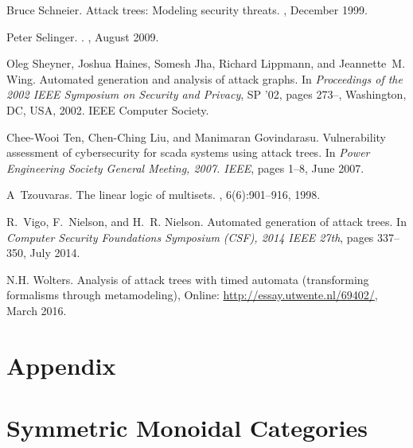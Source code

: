 \documentclass{sigplanconf}
\begin{document}
\begin{thebibliography}{10}
Bruce Schneier.
\newblock Attack trees: Modeling security threats.
, December 1999.

Peter {Selinger}.
.
, August 2009.

Oleg Sheyner, Joshua Haines, Somesh Jha, Richard Lippmann, and Jeannette~M.
  Wing.
\newblock Automated generation and analysis of attack graphs.
\newblock In {\em Proceedings of the 2002 IEEE Symposium on Security and
  Privacy}, SP '02, pages 273--, Washington, DC, USA, 2002. IEEE Computer
  Society.

Chee-Wooi Ten, Chen-Ching Liu, and Manimaran Govindarasu.
\newblock Vulnerability assessment of cybersecurity for scada systems using
  attack trees.
\newblock In {\em Power Engineering Society General Meeting, 2007. IEEE}, pages
  1--8, June 2007.

A~Tzouvaras.
\newblock The linear logic of multisets.
, 6(6):901--916, 1998.

R.~Vigo, F.~Nielson, and H.~R. Nielson.
\newblock Automated generation of attack trees.
\newblock In {\em Computer Security Foundations Symposium (CSF), 2014 IEEE
  27th}, pages 337--350, July 2014.

N.H. {Wolters}.
\newblock Analysis of attack trees with timed automata (transforming formalisms
  through metamodeling), Online: \url{http://essay.utwente.nl/69402/},
  March 2016.  
  
\end{thebibliography}


\appendix

\section*{Appendix}
\label{sec:appendix}
\section{Symmetric Monoidal Categories}
\label{sec:symmetric_monoidal_categories}

\end{document}
